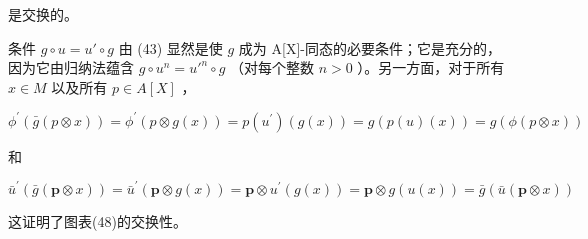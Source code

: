 是交换的。

条件 \(g \circ u = u' \circ g\) 由 (43) 显然是使 \(g\) 成为 A{[}X{]}-同态的必要条件；它是充分的，因为它由归纳法蕴含 \(g \circ u^n = u'^n \circ g\) （对每个整数 \(n > 0\) ）。另一方面，对于所有 \(x \in M\) 以及所有 \(p \in A[X]\) ，

\[
\phi^ {\prime} (\bar {g} (p \otimes x)) = \phi^ {\prime} (p \otimes g (x)) = p (u ^ {\prime}) (g (x)) = g (p (u) (x)) = g (\phi (p \otimes x))
\]

和

\[
\bar {u} ^ {\prime} (\bar {g} (\boldsymbol {p} \otimes x)) = \bar {u} ^ {\prime} (\boldsymbol {p} \otimes g (x)) = \boldsymbol {p} \otimes u ^ {\prime} (g (x)) = \boldsymbol {p} \otimes g (u (x)) = \bar {g} (\bar {u} (\boldsymbol {p} \otimes x))
\]

这证明了图表(48)的交换性。

